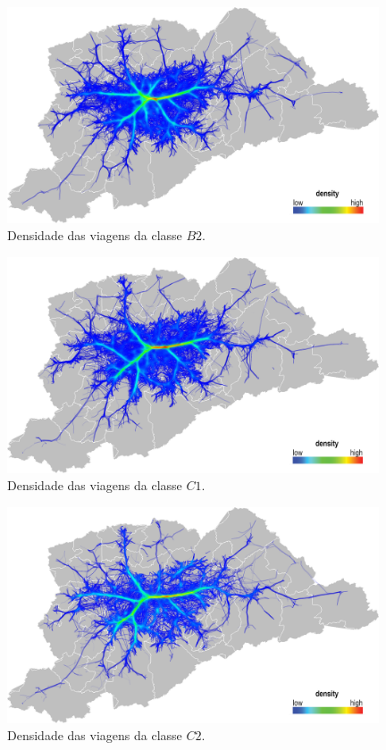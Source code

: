 \begin{figure}[!htb]
  \centering
  \captionsetup{justification=centering}
  \includegraphics[width=0.98\textwidth]{../figuras/3-class-b2.png}
  \caption{Densidade das viagens da classe $B2$. \label{fig:becc-b2}}
\end{figure}

\begin{figure}[!htb]
  \centering
  \captionsetup{justification=centering}
  \includegraphics[width=0.98\textwidth]{../figuras/4-class-c1.png}
  \caption{Densidade das viagens da classe $C1$. \label{fig:becc-c1}}
\end{figure}

\begin{figure}[!htb]
  \centering
  \captionsetup{justification=centering}
  \includegraphics[width=0.98\textwidth]{../figuras/5-class-c2.png}
  \caption{Densidade das viagens da classe $C2$. \label{fig:becc-c2}}
\end{figure}

